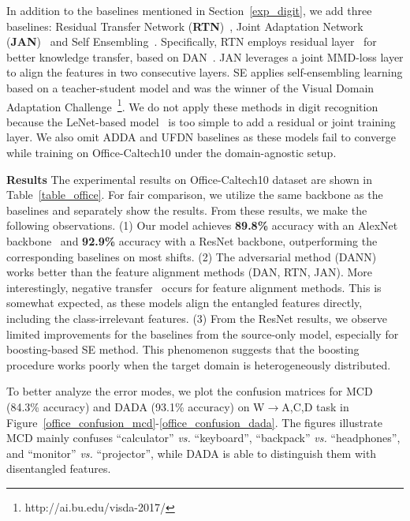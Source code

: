 \documentclass{article}
\begin{document}
In addition to the baselines mentioned in Section~\ref{exp_digit}, we add three baselines: Residual Transfer Network (\textbf{RTN})~\cite{RTN}, Joint Adaptation Network (\textbf{JAN})~\cite{JAN} and Self Ensembling~\cite{SE}. Specifically, RTN employs residual layer~\cite{resnet} for better knowledge transfer, based on DAN~\cite{long2015}. JAN leverages a joint MMD-loss layer to align the features in two consecutive layers. SE applies self-ensembling learning based on a teacher-student model and was the winner of the Visual Domain Adaptation Challenge~\footnote{http://ai.bu.edu/visda-2017/}. We do not apply these methods in digit recognition because the LeNet-based model~\cite{lecun89} is too simple to add a residual or joint training layer. We also omit ADDA and UFDN baselines as these models fail to converge while training on Office-Caltech10 under the domain-agnostic setup. 

\textbf{Results} The experimental results on Office-Caltech10 dataset are shown in Table~\ref{table_office}. For fair comparison, we utilize the same backbone as the baselines and separately show the results. From these results, we make the following observations. (1) Our model achieves \textbf{89.8\%} accuracy with an AlexNet backbone~\cite{alexnet} and \textbf{92.9\%} accuracy with a ResNet backbone, outperforming the corresponding baselines on most shifts. 
(2) The adversarial method (DANN) works better than the feature alignment methods (DAN, RTN, JAN). More interestingly, negative transfer~\cite{pan2010survey} occurs for feature alignment methods. This is somewhat expected, as these models align the entangled features directly, including the class-irrelevant features. (3) From the ResNet results, we observe limited improvements for the baselines from the source-only model, especially for boosting-based SE method. This phenomenon suggests that the boosting procedure works poorly when the target domain is heterogeneously distributed. 

To better analyze the error modes, we plot the confusion matrices for MCD (84.3\% accuracy) and DADA (93.1\% accuracy)  on W$\rightarrow$A,C,D task in Figure~\ref{office_confusion_mcd}-\ref{office_confusion_dada}. The figures illustrate MCD mainly confuses  ``calculator'' \textit{vs.} ``keyboard'',  ``backpack'' \textit{vs.} ``headphones'', and ``monitor'' \textit{vs.} ``projector'', while DADA is able to distinguish them with disentangled features.
\end{document}
